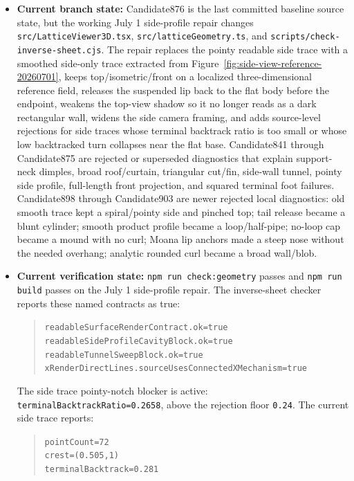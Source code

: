 \documentclass[12pt,letterpaper]{article}
\newcommand{\code}[1]{\texttt{#1}}
\newcommand{\pathcode}[1]{\nolinkurl{#1}}
\begin{document}
\begin{itemize}
  \item \textbf{Current branch state:} Candidate876 is the last committed baseline source state, but the working July 1 side-profile repair changes \pathcode{src/LatticeViewer3D.tsx}, \pathcode{src/latticeGeometry.ts}, and \pathcode{scripts/check-inverse-sheet.cjs}. The repair replaces the pointy readable side trace with a smoothed side-only trace extracted from Figure~\ref{fig:side-view-reference-20260701}, keeps top/isometric/front on a localized three-dimensional reference field, releases the suspended lip back to the flat body before the endpoint, weakens the top-view shadow so it no longer reads as a dark rectangular wall, widens the side camera framing, and adds source-level rejections for side traces whose terminal backtrack ratio is too small or whose low backtracked turn collapses near the flat base. Candidate841 through Candidate875 are rejected or superseded diagnostics that explain support-neck dimples, broad roof/curtain, triangular cut/fin, side-wall tunnel, pointy side profile, full-length front projection, and squared terminal foot failures. Candidate898 through Candidate903 are newer rejected local diagnostics: old smooth trace kept a spiral/pointy side and pinched top; tail release became a blunt cylinder; smooth product profile became a loop/half-pipe; no-loop cap became a mound with no curl; Moana lip anchors made a steep nose without the needed overhang; analytic rounded curl became a broad wall/blob.
  \item \textbf{Current verification state:} \code{npm run check:geometry} passes and \code{npm run build} passes on the July 1 side-profile repair. The inverse-sheet checker reports these named contracts as true:
  \begin{quote}\footnotesize\raggedright
  \pathcode{readableSurfaceRenderContract.ok=true}\\
  \pathcode{readableSideProfileCavityBlock.ok=true}\\
  \pathcode{readableTunnelSweepBlock.ok=true}\\
  \pathcode{xRenderDirectLines.sourceUsesConnectedXMechanism=true}
  \end{quote}
  The side trace pointy-notch blocker is active: \code{terminalBacktrackRatio=0.2658}, above the rejection floor \code{0.24}. The current side trace reports:
  \begin{quote}\footnotesize\raggedright
  \pathcode{pointCount=72}\\
  \pathcode{crest=(0.505,1)}\\
  \pathcode{terminalBacktrack=0.281}\\

\end{quote}
\end{itemize}
\end{document}
